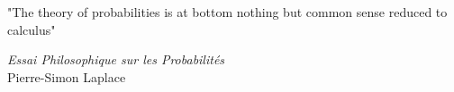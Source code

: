 
\epigraph{"The theory of probabilities is at bottom nothing but common sense reduced to calculus"
}{\textit{Essai Philosophique sur les Probabilités} \\ 
    Pierre-Simon Laplace}
